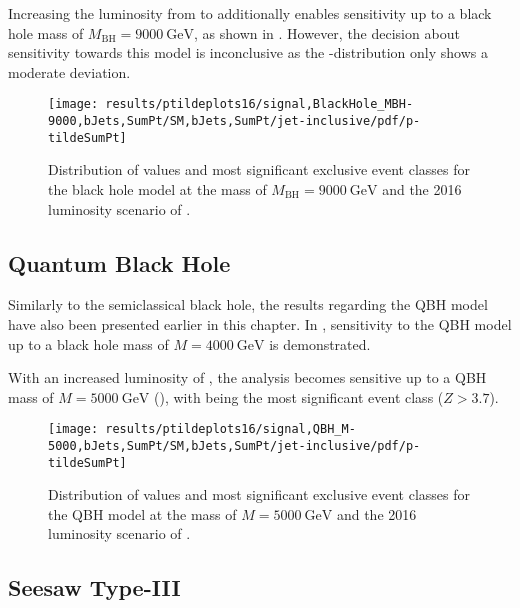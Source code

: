 Increasing the luminosity from \lumiA to \lumiB additionally enables sensitivity up to a black hole mass of $M_\text{BH} = \SI{9000}{\GeV}$, as shown in . However, the decision about sensitivity towards this model is inconclusive as the \ptilde-distribution only shows a moderate deviation. 
\begin{figure}
    \centering
    \texttt{[image: results/ptildeplots16/signal,BlackHole\_MBH-9000,bJets,SumPt/SM,bJets,SumPt/jet-inclusive/pdf/p-tildeSumPt]}
    {
        
    }
    \caption{Distribution of \ptilde values and most significant exclusive event classes for the black hole model at the mass of $M_\text{BH} = \SI{9000}{\GeV}$ and the 2016 luminosity scenario of \lumiB.}
    \label{fig:result_bh_9000}
\end{figure}

\subsection{Quantum Black Hole}
\label{sec:results_qbh}

Similarly to the semiclassical black hole, the results regarding the \ac{QBH} model have also been presented earlier in this chapter. In , sensitivity to the \ac{QBH} model up to a black hole mass of $M = \SI{4000}{\GeV}$ is demonstrated.

With an increased luminosity of \lumiB, the analysis becomes sensitive up to a \ac{QBH} mass of  $M = \SI{5000}{\GeV}$ (), with  being the most significant event class ($Z > \num{3.7}$).

\begin{figure}
    \centering
    \texttt{[image: results/ptildeplots16/signal,QBH\_M-5000,bJets,SumPt/SM,bJets,SumPt/jet-inclusive/pdf/p-tildeSumPt]}
    {
        
    }
    \caption{Distribution of \ptilde values and most significant exclusive event classes for the \acl{QBH} model at the mass of $M = \SI{5000}{\GeV}$ and the 2016 luminosity scenario of \lumiB.}
    \label{fig:result_qbh_5000}
\end{figure}


\subsection{Seesaw Type-III}
\label{sec:results_seesaw}

